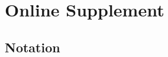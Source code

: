 
\appendix

\renewcommand*\thetable{\Alph{section}\arabic{table}}

\newpage
\setcounter{page}{1}
\setcounter{section}{18}
\setcounter{table}{0}
\section{Online Supplement} \label{Supplement}
\subsection{Notation}
